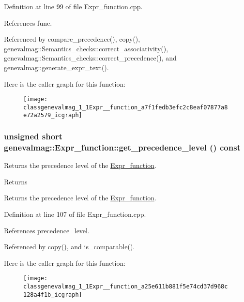 Definition at line 99 of file Expr\_\-function.cpp.



References func.



Referenced by compare\_\-precedence(), copy(), genevalmag::Semantics\_\-checks::correct\_\-associativity(), genevalmag::Semantics\_\-checks::correct\_\-precedence(), and genevalmag::generate\_\-expr\_\-text().



Here is the caller graph for this function:\nopagebreak
\begin{figure}[H]
\begin{center}
\leavevmode
\texttt{[image: classgenevalmag\_1\_1Expr\_\_function\_a7f1fedb3efc2c8eaf07877a8e72a2579\_icgraph]}
\end{center}
\end{figure}


\hypertarget{classgenevalmag_1_1Expr__function_a25e611b881f5e74cd37d968c128a4f1b}{
\subsubsection[{get\_\-precedence\_\-level}]{\setlength{\rightskip}{0pt plus 5cm}unsigned short genevalmag::Expr\_\-function::get\_\-precedence\_\-level () const}}
\label{classgenevalmag_1_1Expr__function_a25e611b881f5e74cd37d968c128a4f1b}
Returns the precedence level of the \hyperlink{classgenevalmag_1_1Expr__function}{Expr\_\-function}. \begin{DoxyReturn}{Returns}

\end{DoxyReturn}
Returns the precedence level of the \hyperlink{classgenevalmag_1_1Expr__function}{Expr\_\-function}. 

Definition at line 107 of file Expr\_\-function.cpp.



References precedence\_\-level.



Referenced by copy(), and is\_\-comparable().



Here is the caller graph for this function:\nopagebreak
\begin{figure}[H]
\begin{center}
\leavevmode
\texttt{[image: classgenevalmag\_1\_1Expr\_\_function\_a25e611b881f5e74cd37d968c128a4f1b\_icgraph]}
\end{center}
\end{figure}


